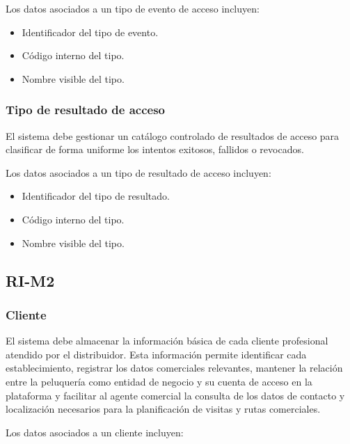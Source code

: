 Los datos asociados a un tipo de evento de acceso incluyen:

\begin{itemize}
    \item Identificador del tipo de evento.
    \item Código interno del tipo.
    \item Nombre visible del tipo.
\end{itemize}

\subsubsection*{Tipo de resultado de acceso}

El sistema debe gestionar un catálogo controlado de resultados de acceso para clasificar de forma uniforme los intentos exitosos, fallidos o revocados.

Los datos asociados a un tipo de resultado de acceso incluyen:

\begin{itemize}
    \item Identificador del tipo de resultado.
    \item Código interno del tipo.
    \item Nombre visible del tipo.
\end{itemize}

\subsection{RI-M2}

\subsubsection*{Cliente}

El sistema debe almacenar la información básica de cada cliente profesional atendido por el distribuidor. Esta información permite identificar cada establecimiento, registrar los datos comerciales relevantes, mantener la relación entre la peluquería como entidad de negocio y su cuenta de acceso en la plataforma y facilitar al agente comercial la consulta de los datos de contacto y localización necesarios para la planificación de visitas y rutas comerciales.

Los datos asociados a un cliente incluyen:

